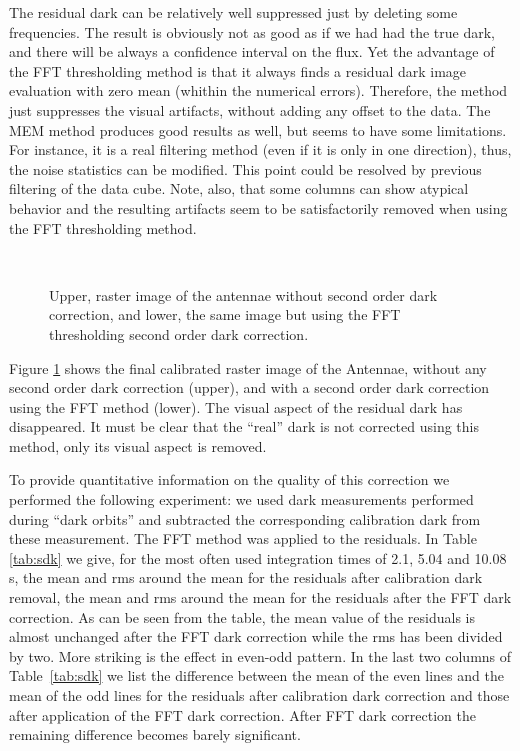 The residual dark can be relatively well suppressed just by deleting
some frequencies. The result is obviously not as good as if we had had
the true dark, and there will be always a confidence interval on the
flux.  Yet the advantage of the FFT thresholding method is that it
always finds a residual dark image evaluation with zero
mean (whithin the numerical errors). Therefore, the method just suppresses the visual artifacts,
without adding any offset to the data.  The MEM method produces good
results as well, but seems to have some limitations. For instance, it
is a real filtering method (even if it is only in one direction), thus, the
noise statistics can be modified. This point could be resolved by
previous filtering of the data cube. Note, also, that some columns
can show   atypical behavior and the resulting artifacts seem to be
satisfactorily removed when using the FFT thresholding method.
\begin{figure}[htb]
\centerline{
\hbox{
}}
\caption{Upper, raster image of the antennae without second order dark
correction, and lower, the same image but using the FFT thresholding
second order dark correction. }
\label{fig_ant_fft_dark}
\end{figure}

Figure \ref{fig_ant_fft_dark} shows the final calibrated raster image
of the Antennae, without any second order dark correction (upper), and
with a second order dark correction using the FFT method (lower). The
visual aspect of the residual dark has disappeared. It must be clear
that the ``real'' dark is not corrected using this method, only its
visual aspect is removed.


To provide quantitative information on the quality of this correction
we performed the following experiment: we used dark measurements
performed during ``dark orbits''  and 
subtracted the corresponding calibration dark
from these measurement. 
The FFT method was applied to the  
residuals. In Table \ref{tab:sdk} we give, for the most often used
integration times of 2.1, 5.04 and 10.08\,s, the mean and rms around
the mean for the residuals after calibration dark removal, the mean
and rms around the mean for the residuals after the FFT dark
correction. As can be seen from the table, the mean value of the
residuals is almost unchanged after the FFT dark correction while the
rms has been divided by two. More striking  is the effect in  
even-odd pattern. In the last two columns of Table~\ref{tab:sdk} we
list the difference between the mean of the even lines and the mean of
the odd lines for the residuals after calibration dark correction and
those after application of the FFT dark correction. After FFT dark
correction the remaining difference becomes barely significant.

